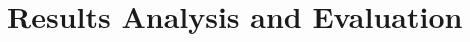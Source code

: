 \documentclass[paper=a4, fontsize=10pt, font=arial]{scrartcl} %
\numberwithin{equation}{section} %
\numberwithin{figure}{section} %
\numberwithin{table}{section} %
\begin{document}



\newpage
\section{Results Analysis and Evaluation}
\end{document}
